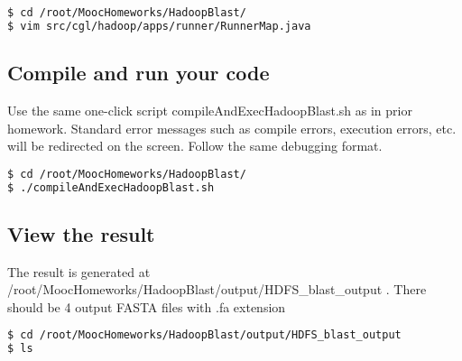 \begin{lstlisting}[language=bash]
$ cd /root/MoocHomeworks/HadoopBlast/
$ vim src/cgl/hadoop/apps/runner/RunnerMap.java
\end{lstlisting}

\subsection*{Compile and run your code}
Use the same one-click script compileAndExecHadoopBlast.sh as in prior
homework. Standard error messages such as compile errors, execution errors,
etc. will be redirected on the screen. Follow the same debugging format.

\begin{lstlisting}[language=bash]
$ cd /root/MoocHomeworks/HadoopBlast/
$ ./compileAndExecHadoopBlast.sh 
\end{lstlisting}

\subsection*{View the result} 
The result is generated at
/root/MoocHomeworks/HadoopBlast/output/HDFS\_blast\_output . There should be 4
output FASTA files with .fa extension

\begin{lstlisting}[language=bash]
$ cd /root/MoocHomeworks/HadoopBlast/output/HDFS_blast_output
$ ls
\end{lstlisting}
